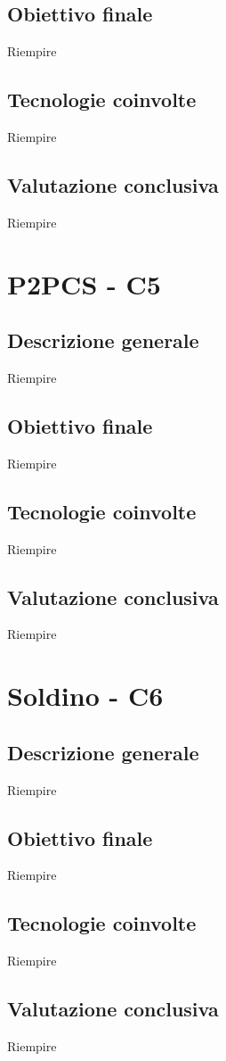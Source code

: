 		\subsection{Obiettivo finale}
		Riempire
		
		\subsection{Tecnologie coinvolte}
		Riempire
		
		\subsection{Valutazione conclusiva}
		Riempire
	
	
	\section{P2PCS - C5} \label{c5}
		\subsection{Descrizione generale}
		Riempire
		
		\subsection{Obiettivo finale}
		Riempire
		
		\subsection{Tecnologie coinvolte}
		Riempire
		
		\subsection{Valutazione conclusiva}
		Riempire
	
	
	\section{Soldino - C6} \label{c6}
		\subsection{Descrizione generale}
		Riempire
		
		\subsection{Obiettivo finale}
		Riempire
		
		\subsection{Tecnologie coinvolte}
		Riempire
		
		\subsection{Valutazione conclusiva}
		Riempire
		
	

